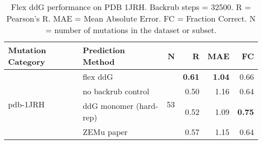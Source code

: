 \begin{table}
  \begin{tabular}{llrrrr}
\toprule
Mutation Category &       Prediction Method &   N &    R &  MAE &   FC \\
\midrule
 \multirow{ 4}{*}{pdb-1JRH} & flex ddG & \multirow{ 4}{*}{53} & \textbf{0.61} & \textbf{1.04} & 0.66  \\
 & no backrub control & & 0.50 & 1.16 & 0.64  \\
 & ddG monomer (hard-rep) & & 0.52 & 1.09 & \textbf{0.75}  \\
 & ZEMu paper & & 0.57 & 1.15 & 0.64  \\
\bottomrule
\end{tabular}
  \caption[Flex ddG performance on PDB 1JRH]{
    Flex ddG performance on PDB 1JRH. Backrub steps = 32500. R = Pearson's R. MAE = Mean Absolute Error. FC = Fraction Correct. N = number of mutations in the dataset or subset.
  } \label{tab:table-pdb-1JRH}
\end{table}
